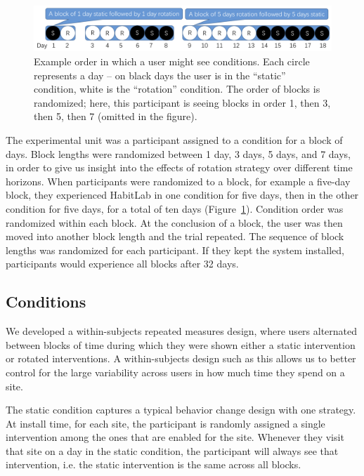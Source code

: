 
\begin{figure}[tb]
\centering
	\includegraphics[width=1.0\textwidth]{figures/experiment1_design_figure_v2.png}
	\caption{Example order in which a user might see conditions. Each circle represents a day -- on black days the user is in the ``static'' condition, white is the ``rotation'' condition. The order of blocks is randomized; here, this participant is seeing blocks in order 1, then 3, then 5, then 7 (omitted in the figure).}
\label{fig:experiment1_design_figure}
\end{figure}

The experimental unit was a participant assigned to a condition for a block of days. Block lengths were randomized between 1 day, 3 days, 5 days, and 7 days, in order to give us insight into the effects of rotation strategy over different time horizons. When participants were randomized to a block, for example a five-day block, they experienced HabitLab in one condition for five days, then in the other condition for five days, for a total of ten days (Figure~\ref{fig:experiment1_design_figure}). Condition order was randomized within each block. At the conclusion of a block, the user was then moved into another block length and the trial repeated. The sequence of block lengths was randomized for each participant. If they kept the system installed, participants would experience all blocks after 32 days.

\subsection{Conditions}
We developed a within-subjects repeated measures design, where users alternated between blocks of time during which they were shown either a static intervention or rotated interventions. A within-subjects design such as this allows us to better control for the large variability across users in how much time they spend on a site.

The static condition captures a typical behavior change design with one strategy. At install time, for each site, the participant is randomly assigned a single intervention among the ones that are enabled for the site. Whenever they visit that site on a day in the static condition, the participant will always see that intervention, i.e. the static intervention is the same across all blocks.

